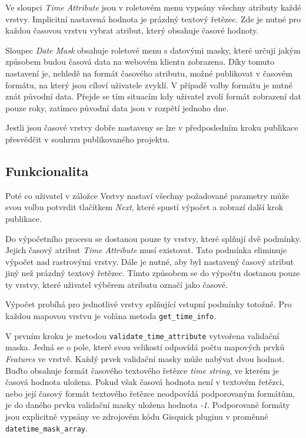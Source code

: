 Ve sloupci \textit{Time Attribute} jsou v roletovém menu vypsány
všechny atributy každé vrstvy. Implicitní nastavená hodnota je prázdný
textový řetězec. Zde je nutné pro každou časovou vrstvu vybrat
atribut, který obsahuje časové hodnoty.

Sloupec \textit{Date Mask} obsahuje roletové menu s datovými masky,
které určují jakým způsobem budou časová data na webovém klientu
zobrazena. Díky tomuto nastavení je, nehledě na formát časového
atributu, možné publikovat v časovém formátu, na který jsou cíloví
uživatele zvyklí. V případě volby formátu je nutné znát původní
data. Přejde se tím situacím kdy uživatel zvolí formát zobrazení dat
pouze roky, zatímco původní data jsou v rozpětí jednoho dne.

Jestli jsou časové vrstvy dobře nastaveny se lze v předposledním kroku
publikace přesvědčit v souhrnu publikovaného projektu.

\subsection{Funkcionalita}

Poté co uživatel v záložce Vrstvy nastaví všechny požadované parametry
může svou volbu potvrdit tlačítkem \textit{Next}, které spustí výpočet
a zobrazí další krok publikace.

Do výpočetního procesu se dostanou pouze ty vrstvy, které splňují dvě
podmínky. Jejich časový atribut \textit{Time Attribute} musí
existovat. Tato podmínka eliminuje výpočet nad rastrovými vrstvy. Dále
je nutné, aby byl nastavený časový atribut jiný než prázdný textový
řetězec. Tímto způsobem se do výpočtu dostanou pouze ty vrstvy, které
uživatel výběrem atributu označí jako časové.

Výpočet probíhá pro jednotlivé vrstvy splňující vstupní podmínky
totožně. Pro každou mapovou vrstvu je volána
metoda \verb|get_time_info|.

V prvním kroku je metodou \verb|validate_time_attribute| vytvořena
validační maska. Jedná se o pole, které svou velikostí odpovídá počtu
mapových prvků \textit{Features} ve vrstvě. Každý prvek validační
masky může nabývat dvou hodnot. Buďto obsahuje formát časového
textového řetězce \textit{time string}, ve kterém je časová hodnota
uložena. Pokud však časová hodnota není v textovém řetězci, nebo její
časový formát textového řetězce neodpovídá podporovaným formátům, je
do daného prvku validační masky uložena
hodnota \textit{-1}. Podporované formáty jsou explicitně vypsány ve
zdrojovém kódu Gisquick pluginu v proměnné \verb|datetime_mask_array|.

